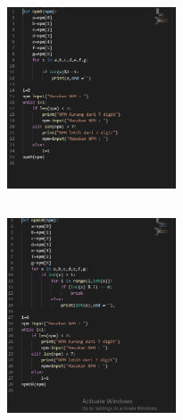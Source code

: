 \documentclass{article}
\begin{document}
\subsection{}
\begin{figure}[h]
\centerline{\includegraphics[width=5cm]{figure/H.PNG}}
\end{figure}
\newpage\subsection{}
\begin{figure}[h]
\centerline{\includegraphics[width=5cm]{figure/I.PNG}}
\end{figure}
\end{document}
